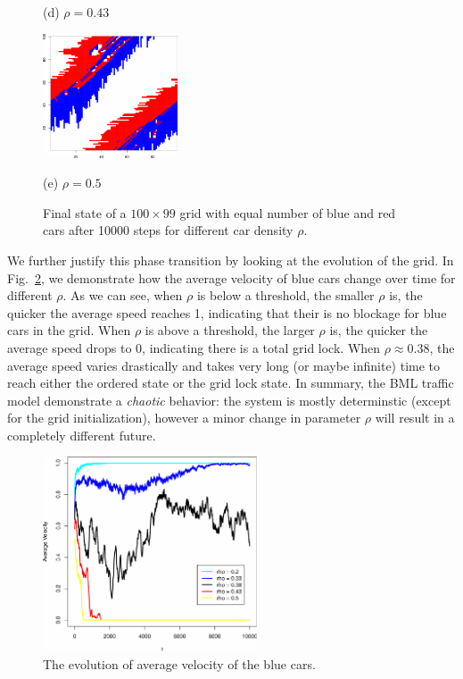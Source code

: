 \documentclass[twocolumn]{article}
\begin{document}
\begin{figure}[!t]
\begin{minipage}[b]{0.49\linewidth}
      \centerline{(d) $\rho = 0.43$}\medskip
    \end{minipage}
    \hfill
    \begin{minipage}[b]{1\linewidth}
      \centering
      \centerline{\includegraphics[width=4.0cm]{./figs/TestBehavior_100_99_10000_05_end}}
      \centerline{(e) $\rho = 0.5$}\medskip
    \end{minipage}
    \caption{Final state of a $100\times99$ grid with equal number of blue and
    red cars after 10000 steps for different car density $\rho$.}
    \label{fig:final_state}
\end{figure}

We further justify this phase transition by looking at the evolution of the
grid. In Fig.~\ref{fig:average_velocity}, we demonstrate how the average
velocity of blue cars change over time for different $\rho$. As we can see, when
$\rho$ is below a threshold, the smaller $\rho$ is, the quicker the average
speed reaches 1, indicating that their is no blockage for blue cars in the grid.
When $\rho$ is above a threshold, the larger $\rho$ is, the quicker the average
speed drops to 0, indicating there is a total grid lock. When $\rho\approx
0.38$, the average speed varies drastically and takes very long (or maybe
infinite) time to reach either the ordered state or the grid lock state. In
summary, the BML traffic model demonstrate a \emph{chaotic} behavior: the system
is mostly determinstic (except for the grid initialization), however a minor
change in parameter $\rho$ will result in a completely different future.

\begin{figure}[h]
    \centering
    \includegraphics[width=2.5in]{figs/TestVelocity.pdf}
    \caption{The evolution of average velocity of the blue cars.}
    \label{fig:average_velocity}
\end{figure}
\end{document}
